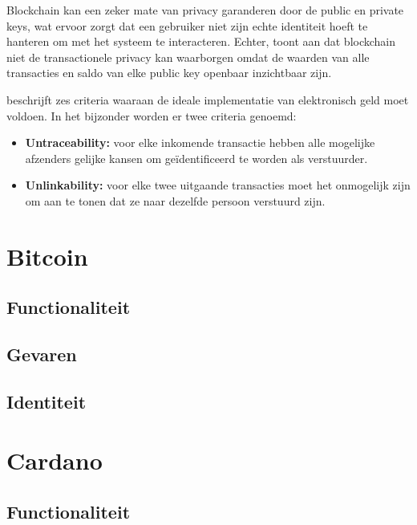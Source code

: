Blockchain kan een zeker mate van privacy garanderen door de public en private keys, wat ervoor zorgt dat een gebruiker niet zijn echte identiteit hoeft te hanteren om met het systeem te interacteren. Echter, \cite{meiklejohn2013fistful} toont aan dat blockchain niet de transactionele privacy kan waarborgen omdat de waarden van alle transacties en saldo van elke public key openbaar inzichtbaar zijn.

\citet{Okamoto:1991:UEC:646756.705374} beschrijft zes criteria waaraan de ideale implementatie van elektronisch geld moet voldoen. In het bijzonder worden er twee criteria genoemd:

\begin{itemize}
  \item \textbf{Untraceability:} voor elke inkomende transactie hebben alle mogelijke afzenders gelijke kansen om geïdentificeerd te worden als verstuurder. 
  
  \item \textbf{Unlinkability:} voor elke twee uitgaande transacties moet het onmogelijk zijn om aan te tonen dat ze naar dezelfde persoon verstuurd zijn.
\end{itemize}

\newpage

\section{Bitcoin}
\subsection{Functionaliteit}

\subsection{Gevaren}

\subsection{Identiteit}


\newpage

\section{Cardano}
\subsection{Functionaliteit}

